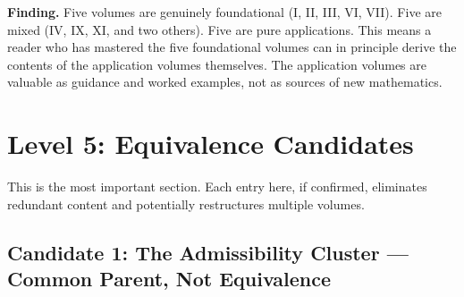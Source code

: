 \documentclass[11pt, a4paper]{article}
\begin{document}
\medskip
\begin{notebox}
\textbf{Finding.} Five volumes are genuinely foundational (I, II, III,
VI, VII). Five are mixed (IV, IX, XI, and two others). Five are pure
applications. This means a reader who has mastered the five foundational
volumes can in principle derive the contents of the application volumes
themselves. The application volumes are valuable as guidance and
worked examples, not as sources of new mathematics.
\end{notebox}

\section{Level 5: Equivalence Candidates}

This is the most important section. Each entry here, if confirmed,
eliminates redundant content and potentially restructures multiple
volumes.

\subsection{Candidate 1: The Admissibility Cluster --- Common Parent, Not Equivalence}
\end{document}
